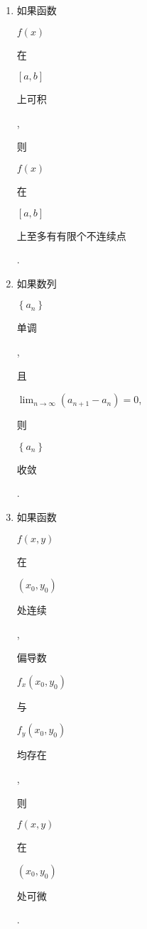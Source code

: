 \documentclass[10pt]{article}
\begin{document}
\begin{enumerate}
  \item \begin{CJK}{UTF8}{mj}如果函数\end{CJK} $f(x)$ \begin{CJK}{UTF8}{mj}在\end{CJK} $[a, b]$ \begin{CJK}{UTF8}{mj}上可积\end{CJK}, \begin{CJK}{UTF8}{mj}则\end{CJK} $f(x)$ \begin{CJK}{UTF8}{mj}在\end{CJK} $[a, b]$ \begin{CJK}{UTF8}{mj}上至多有有限个不连续点\end{CJK}.

  \item \begin{CJK}{UTF8}{mj}如果数列\end{CJK} $\left\{a_{n}\right\}$ \begin{CJK}{UTF8}{mj}单调\end{CJK}, \begin{CJK}{UTF8}{mj}且\end{CJK} $\lim _{n \rightarrow \infty}\left(a_{n+1}-a_{n}\right)=0$, \begin{CJK}{UTF8}{mj}则\end{CJK} $\left\{a_{n}\right\}$ \begin{CJK}{UTF8}{mj}收敛\end{CJK}.

  \item \begin{CJK}{UTF8}{mj}如果函数\end{CJK} $f(x, y)$ \begin{CJK}{UTF8}{mj}在\end{CJK} $\left(x_{0}, y_{0}\right)$ \begin{CJK}{UTF8}{mj}处连续\end{CJK}, \begin{CJK}{UTF8}{mj}偏导数\end{CJK} $f_{x}\left(x_{0}, y_{0}\right)$ \begin{CJK}{UTF8}{mj}与\end{CJK} $f_{y}\left(x_{0}, y_{0}\right)$ \begin{CJK}{UTF8}{mj}均存在\end{CJK}, \begin{CJK}{UTF8}{mj}则\end{CJK} $f(x, y)$ \begin{CJK}{UTF8}{mj}在\end{CJK} $\left(x_{0}, y_{0}\right)$ \begin{CJK}{UTF8}{mj}处可微\end{CJK}.


\end{enumerate}
\end{document}
